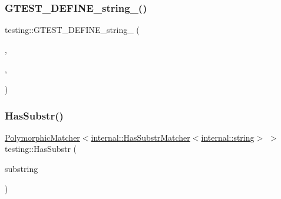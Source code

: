 \mbox{\label{namespacetesting_a145c2b7b4242b148b8d167f737b0d7c6}} 
\subsubsection{\texorpdfstring{G\+T\+E\+S\+T\+\_\+\+D\+E\+F\+I\+N\+E\+\_\+string\+\_\+()}{GTEST\_DEFINE\_string\_()}\hspace{0.1cm}{\footnotesize\ttfamily [5/5]}}
{\footnotesize\ttfamily testing\+::\+G\+T\+E\+S\+T\+\_\+\+D\+E\+F\+I\+N\+E\+\_\+string\+\_\+ (\begin{DoxyParamCaption}\item[{stream\+\_\+result\+\_\+to}]{,  }\item[{\hyperlink{namespacetesting_1_1internal_ac54dabc540bf79c2de91add679bfb93b}{internal\+::\+String\+From\+G\+Test\+Env}(\char`\"{}stream\+\_\+result\+\_\+to\char`\"{}, \char`\"{}\char`\"{})}]{,  }\item[{\char`\"{}This flag specifies the host name and the port number on which to stream \char`\"{} \char`\"{}test results. Example\+: \textbackslash{}alhost\+:555\textbackslash{}he flag is effective only on \char`\"{} \char`\"{}Linux.\char`\"{}}]{ }\end{DoxyParamCaption})}

\mbox{\label{namespacetesting_a7d27682e38d57eea81ba145a2772e1c7}} 
\subsubsection{\texorpdfstring{Has\+Substr()}{HasSubstr()}}
{\footnotesize\ttfamily \hyperlink{classtesting_1_1_polymorphic_matcher}{Polymorphic\+Matcher}$<$\hyperlink{classtesting_1_1internal_1_1_has_substr_matcher}{internal\+::\+Has\+Substr\+Matcher}$<$\hyperlink{namespacetesting_1_1internal_a8e8ff5b11e64078831112677156cb111}{internal\+::string}$>$ $>$ testing\+::\+Has\+Substr (\begin{DoxyParamCaption}\item[{const \hyperlink{namespacetesting_1_1internal_a8e8ff5b11e64078831112677156cb111}{internal\+::string} \&}]{substring }\end{DoxyParamCaption})\hspace{0.3cm}{\ttfamily [inline]}}

